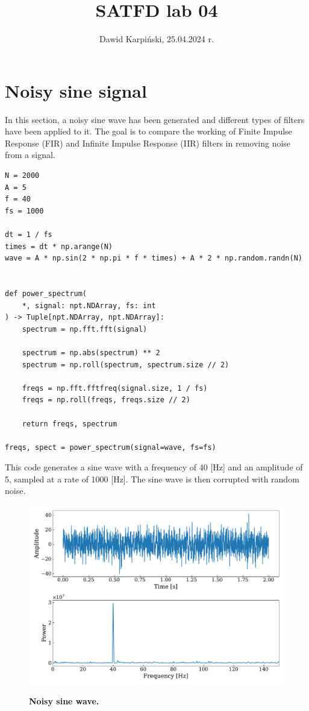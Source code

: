 \documentclass[13pt,a4paper]{article}
\begin{document}
\title{
    \LARGE
    \textbf{SATFD lab 04}
}
\author{
    \large
    Dawid Karpiński, 25.04.2024 r.
}
\date{}
\maketitle

\section{Noisy sine signal}

In this section, a noisy sine wave has been generated and different types of filters have been applied to it. The goal is to compare the working of Finite Impulse Response (FIR) and Infinite Impulse Response (IIR) filters in removing noise from a signal.

\begin{lstlisting}[caption={\textbf{Code snippet for generating the noisy sine wave.}}]
N = 2000
A = 5
f = 40
fs = 1000

dt = 1 / fs
times = dt * np.arange(N)
wave = A * np.sin(2 * np.pi * f * times) + A * 2 * np.random.randn(N)


def power_spectrum(
    *, signal: npt.NDArray, fs: int
) -> Tuple[npt.NDArray, npt.NDArray]:
    spectrum = np.fft.fft(signal)

    spectrum = np.abs(spectrum) ** 2
    spectrum = np.roll(spectrum, spectrum.size // 2)

    freqs = np.fft.fftfreq(signal.size, 1 / fs)
    freqs = np.roll(freqs, freqs.size // 2)

    return freqs, spectrum

freqs, spect = power_spectrum(signal=wave, fs=fs)
\end{lstlisting}

This code generates a sine wave with a frequency of 40 [Hz] and an amplitude of 5, sampled at a rate of 1000 [Hz]. The sine wave is then corrupted with random noise.

\begin{figure}[ht!]
    \centering
    \caption{\textbf{Noisy sine wave.}}
    \includegraphics[width=\linewidth]{wave.pdf}
    \label{fig:wave}
\end{figure}
\pagebreak
\end{document}
